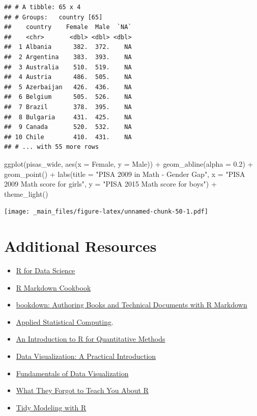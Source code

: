 \documentclass[
]{book}
\newenvironment{Shaded}{\begin{snugshade}}{\end{snugshade}}
\newcommand{\AttributeTok}[1]{\textcolor[rgb]{0.77,0.63,0.00}{#1}}
\newcommand{\FloatTok}[1]{\textcolor[rgb]{0.00,0.00,0.81}{#1}}
\newcommand{\FunctionTok}[1]{\textcolor[rgb]{0.00,0.00,0.00}{#1}}
\newcommand{\NormalTok}[1]{#1}
\newcommand{\SpecialCharTok}[1]{\textcolor[rgb]{0.00,0.00,0.00}{#1}}
\newcommand{\StringTok}[1]{\textcolor[rgb]{0.31,0.60,0.02}{#1}}
\begin{document}
\begin{verbatim}
## # A tibble: 65 x 4
## # Groups:   country [65]
##    country    Female  Male  `NA`
##    <chr>       <dbl> <dbl> <dbl>
##  1 Albania      382.  372.    NA
##  2 Argentina    383.  393.    NA
##  3 Australia    510.  519.    NA
##  4 Austria      486.  505.    NA
##  5 Azerbaijan   426.  436.    NA
##  6 Belgium      505.  526.    NA
##  7 Brazil       378.  395.    NA
##  8 Bulgaria     431.  425.    NA
##  9 Canada       520.  532.    NA
## 10 Chile        410.  431.    NA
## # ... with 55 more rows
\end{verbatim}

\begin{Shaded}
\begin{Highlighting}[]
\FunctionTok{ggplot}\NormalTok{(pisas\_wide, }\FunctionTok{aes}\NormalTok{(}\AttributeTok{x =}\NormalTok{ Female, }\AttributeTok{y =}\NormalTok{ Male)) }\SpecialCharTok{+}
  \FunctionTok{geom\_abline}\NormalTok{(}\AttributeTok{alpha =} \FloatTok{0.2}\NormalTok{) }\SpecialCharTok{+}
  \FunctionTok{geom\_point}\NormalTok{() }\SpecialCharTok{+}
  \FunctionTok{labs}\NormalTok{(}\AttributeTok{title =} \StringTok{"PISA 2009 in Math {-} Gender Gap"}\NormalTok{,}
       \AttributeTok{x =} \StringTok{"PISA 2009 Math score for girls"}\NormalTok{,}
       \AttributeTok{y =} \StringTok{"PISA 2015 Math score for boys"}\NormalTok{) }\SpecialCharTok{+}
  \FunctionTok{theme\_light}\NormalTok{()}
\end{Highlighting}
\end{Shaded}

\texttt{[image: \_main\_files/figure-latex/unnamed-chunk-50-1.pdf]}

\hypertarget{additional-resources}{%
\section*{Additional Resources}\label{additional-resources}}

\begin{itemize}
\item
  \href{https://r4ds.had.co.nz/}{R for Data Science}
\item
  \href{https://bookdown.org/yihui/rmarkdown-cookbook/}{R Markdown Cookbook}
\item
  \href{https://bookdown.org/yihui/bookdown/}{bookdown: Authoring Books and Technical Documents with R Markdown}
\item
  \href{https://stat480-at-isu.github.io/schedule.html}{Applied Statistical Computing}.
\item
  \href{https://people.stat.sc.edu/habing/RforQM/RforQM.htm}{An Introduction to R for Quantitative Methods}
\item
  \href{https://socviz.co/}{Data Visualization: A Practical Introduction}
\item
  \href{https://clauswilke.com/dataviz/index.html}{Fundamentals of Data Visualization}
\item
  \href{https://rstats.wtf/}{What They Forgot to Teach You About R}
\item
  \href{https://www.tmwr.org/}{Tidy Modeling with R}
\end{itemize}
\end{document}
